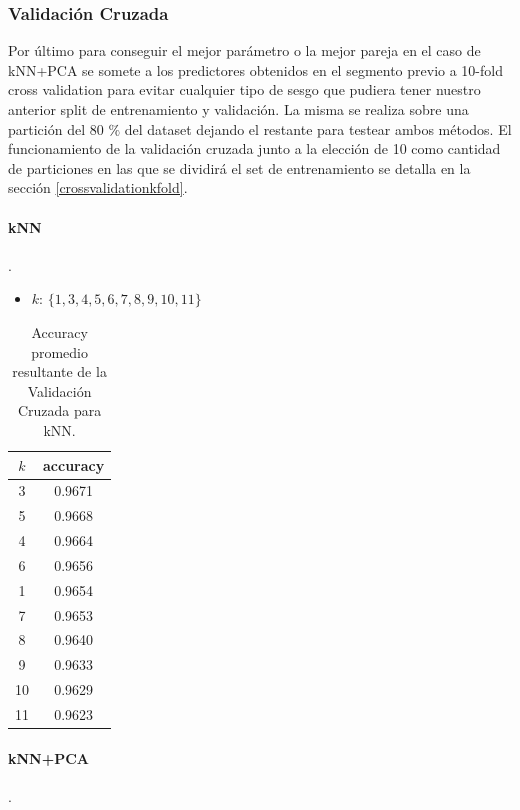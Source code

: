 \subsubsection{Validación Cruzada}

Por último para conseguir el mejor parámetro o la mejor pareja en el caso de kNN+PCA se somete a los predictores obtenidos en el segmento previo a 10-fold cross
validation para evitar cualquier tipo de sesgo que pudiera tener nuestro anterior split de entrenamiento y validación. La misma se realiza sobre una partición del 80 $\%$ del dataset dejando el restante para testear ambos métodos.
El funcionamiento de la validación cruzada junto a la elección de 10 como cantidad de particiones en las que se dividirá el set de entrenamiento se detalla en la sección \ref{crossvalidationkfold}.

\paragraph{kNN}.

\begin{itemize}
    \item \textbf{$k$}: $ \{1,3,4,5,6,7,8,9,10,11\}$
\end{itemize}
\begin{table}[h!]
    \begin{center}
        \begin{tabular}{|c|c|}
        \hline
        \textbf{$k$} & \textbf{accuracy} \\
        \hline
        3 &  0.9671\\
        5 & 0.9668\\
        4 & 0.9664\\
        6 & 0.9656\\
        1 &  0.9654\\
        7 & 0.9653\\
        8 & 0.9640\\
        9 & 0.9633\\
        10 & 0.9629\\
        11 & 0.9623\\
        
        \hline
        \end{tabular}
        \caption{Accuracy promedio resultante de la Validación Cruzada para kNN.}
        \label{knn_crossVal_table}
    \end{center}
\end{table}

\paragraph{kNN+PCA}.

